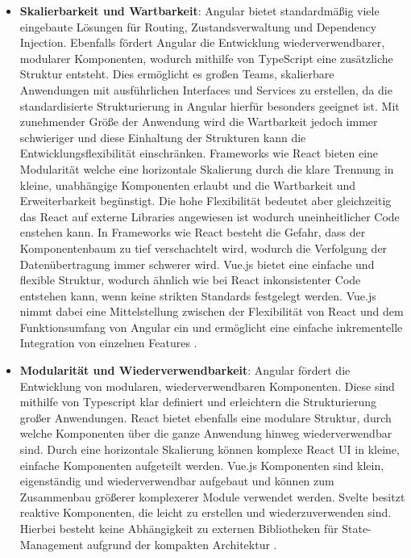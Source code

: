 \documentclass[oneside]{ausarbeitung}
\begin{document}
\begin{itemize}
\item \textbf{Skalierbarkeit und Wartbarkeit}: Angular bietet standardmäßig viele eingebaute Lösungen für Routing, Zustandsverwaltung und Dependency Injection. Ebenfalls fördert Angular die Entwicklung wiederverwendbarer, modularer Komponenten, wodurch mithilfe von TypeScript eine zusätzliche Struktur entsteht. Dies ermöglicht es großen Teams, skalierbare Anwendungen mit ausführlichen Interfaces und Services zu erstellen, da die standardisierte Strukturierung in Angular hierfür besonders geeignet ist. Mit zunehmender Größe der Anwendung wird die Wartbarkeit jedoch immer schwieriger und diese Einhaltung der Strukturen kann die Entwicklungsflexibilität einschränken.
Frameworks wie React bieten eine Modularität welche eine horizontale Skalierung durch die klare Trennung in kleine, unabhängige Komponenten erlaubt und die Wartbarkeit und Erweiterbarkeit begünstigt. Die hohe Flexibilität bedeutet aber gleichzeitig das React auf externe Libraries angewiesen ist wodurch uneinheitlicher Code enstehen kann.
In Frameworks wie React besteht die Gefahr, dass der Komponentenbaum zu tief verschachtelt wird, wodurch die Verfolgung der Datenübertragung immer schwerer wird. 
Vue.js bietet eine einfache und flexible Struktur, wodurch ähnlich wie bei React inkonsistenter Code entstehen kann, wenn keine strikten Standards festgelegt werden. Vue.js nimmt dabei eine Mittelstellung zwischen der Flexibilität von React und dem Funktionsumfang von Angular ein und ermöglicht eine einfache inkrementelle Integration von einzelnen Features
\parencite[S. 25-30]{comparison-frameworks-scalable-apps}.

\item \textbf{Modularität und Wiederverwendbarkeit}: 
Angular fördert die Entwicklung von modularen, wiederverwendbaren Komponenten. Diese sind mithilfe von Typescript klar definiert und erleichtern die Strukturierung großer Anwendungen. 
React bietet ebenfalls eine modulare Struktur, durch welche Komponenten über die ganze Anwendung hinweg wiederverwendbar sind. Durch eine horizontale Skalierung können komplexe React UI in kleine, einfache Komponenten aufgeteilt werden. 
Vue.js Komponenten sind klein, eigenständig und wiederverwendbar aufgebaut und können zum Zusammenbau größerer komplexerer Module verwendet werden. 
Svelte besitzt reaktive Komponenten, die leicht zu erstellen und wiederzuverwenden sind. Hierbei besteht keine Abhängigkeit zu externen Bibliotheken für State-Management aufgrund der kompakten Architektur \cite[S. 24,26] {comparison-frameworks-scalable-apps}.
\end{itemize}
\end{document}
